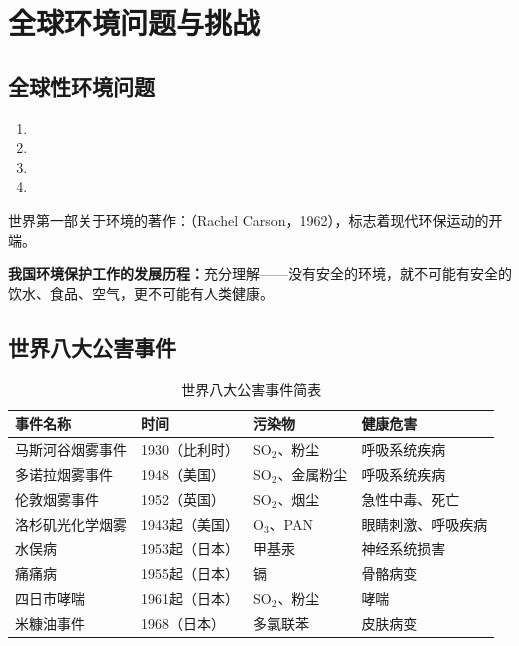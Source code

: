 \section{全球环境问题与挑战}

\subsection{全球性环境问题}
\begin{enumerate}[leftmargin=*]
    \item {}
    \item {}
    \item {}
    \item {}
\end{enumerate}

世界第一部关于环境的著作：（Rachel Carson，1962），标志着现代环保运动的开端。

\textbf{我国环境保护工作的发展历程：}充分理解——没有安全的环境，就不可能有安全的饮水、食品、空气，更不可能有人类健康。

\subsection{世界八大公害事件}

\begin{table}[htbp]
\centering
\caption{世界八大公害事件简表}
\begin{tabularx}{\textwidth}{lXXX}
\hline
\textbf{事件名称} & \textbf{时间} & \textbf{污染物} & \textbf{健康危害} \\
\hline
马斯河谷烟雾事件 & 1930（比利时） & SO$_2$、粉尘 & 呼吸系统疾病 \\
多诺拉烟雾事件 & 1948（美国） & SO$_2$、金属粉尘 & 呼吸系统疾病 \\
伦敦烟雾事件 & 1952（英国） & SO$_2$、烟尘 & 急性中毒、死亡 \\
洛杉矶光化学烟雾 & 1943起（美国） & O$_3$、PAN & 眼睛刺激、呼吸疾病 \\
水俣病 & 1953起（日本） & 甲基汞 & 神经系统损害 \\
痛痛病 & 1955起（日本） & 镉 & 骨骼病变 \\
四日市哮喘 & 1961起（日本） & SO$_2$、粉尘 & 哮喘 \\
米糠油事件 & 1968（日本） & 多氯联苯 & 皮肤病变 \\
\hline
\end{tabularx}
\end{table}


